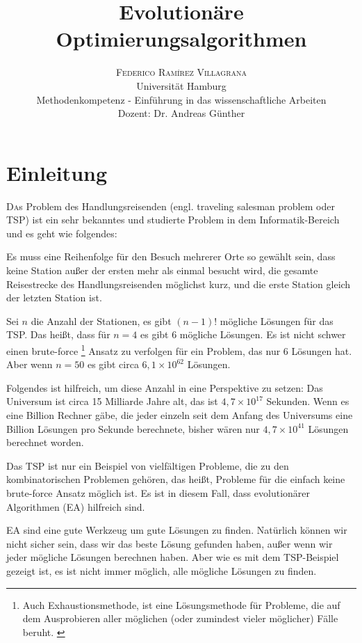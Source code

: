 \documentclass[twoside,twocolumn]{article}
\title{Evolutionäre Optimierungsalgorithmen} %
\author {
	\textsc{Federico Ramírez Villagrana} \\[1ex]
	\normalsize Universität Hamburg \\
	\normalsize Methodenkompetenz - Einführung in das wissenschaftliche Arbeiten \\
	\normalsize Dozent: Dr. Andreas Günther
}
\date{} %
\newcommand{\e}[1]{\times 10^{#1}}
\begin{document}
\maketitle


\section{Einleitung}

\lettrine[nindent=0em,lines=3]{D} as Problem des Handlungsreisenden (engl. traveling salesman problem oder TSP) ist ein sehr bekanntes und studierte Problem in dem Informatik-Bereich und es geht wie folgendes:\par
Es muss eine Reihenfolge für den Besuch mehrerer Orte so gewählt sein, dass keine Station außer der ersten mehr als einmal besucht wird, die gesamte Reisestrecke des Handlungsreisenden möglichst kurz, und die erste Station gleich der letzten Station ist. \cite{wiki_tsp}\par
Sei $n$ die Anzahl der Stationen, es gibt $(n-1)!$ mögliche Lösungen für das TSP. Das heißt, dass für $n=4$ es gibt $6$ mögliche Lösungen. Es ist nicht schwer einen brute-force \footnote{Auch Exhaustionsmethode, ist eine Lösungsmethode für Probleme, die auf dem Ausprobieren aller möglichen (oder zumindest vieler möglicher) Fälle beruht. \cite{wiki_brute_force}} Ansatz zu verfolgen für ein Problem, das nur 6 Lösungen hat. Aber wenn $n=50$ es gibt circa $6,1\e{62}$ Lösungen.\par
Folgendes ist hilfreich, um diese Anzahl in eine Perspektive zu setzen: Das Universum ist circa 15 Milliarde Jahre alt, das ist $4,7\e{17}$ Sekunden. Wenn es eine Billion Rechner gäbe, die jeder einzeln seit dem Anfang des Universums eine Billion Lösungen pro Sekunde berechnete, bisher wären nur $4,7\e{41}$ Lösungen berechnet worden.\par
Das TSP ist nur ein Beispiel von vielfältigen Probleme, die zu den kombinatorischen Problemen gehören, das heißt, Probleme für die einfach keine brute-force Ansatz möglich ist. Es ist in diesem Fall, dass evolutionärer Algorithmen (EA) hilfreich sind.\par
EA sind eine gute Werkzeug um gute Lösungen zu finden. Natürlich können wir nicht sicher sein, dass wir das beste Lösung gefunden haben, außer wenn wir jeder mögliche Lösungen berechnen haben. Aber wie es mit dem TSP-Beispiel gezeigt ist, es ist nicht immer möglich, alle mögliche Lösungen zu finden.
\end{document}
